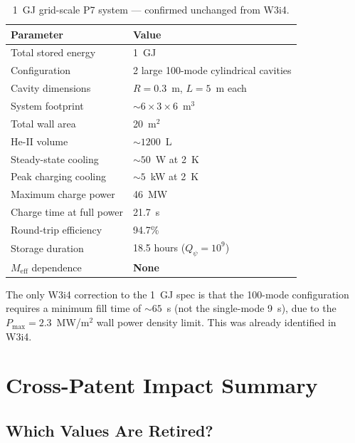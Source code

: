 \documentclass[11pt]{article}
\theoremstyle{definition}
\theoremstyle{remark}
\newcommand{\Meff}{M_{\mathrm{eff}}}
\newcommand{\Qpsi}{Q_\psi}
\newcommand{\Pmax}{P_{\mathrm{max}}}
\begin{document}
\begin{table}[h]
\centering
\caption{1~GJ grid-scale P7 system --- confirmed unchanged from W3i4.}
\label{tab:1GJ}
\begin{tabular}{@{}ll@{}}
\toprule
Parameter & Value \\
\midrule
Total stored energy & 1~GJ \\
Configuration & 2 large 100-mode cylindrical cavities \\
Cavity dimensions & $R = 0.3$~m, $L = 5$~m each \\
System footprint & $\sim 6\times3\times6$~m$^3$ \\
Total wall area & 20~m$^2$ \\
He-II volume & $\sim 1200$~L \\
Steady-state cooling & $\sim 50$~W at 2~K \\
Peak charging cooling & $\sim 5$~kW at 2~K \\
Maximum charge power & 46~MW \\
Charge time at full power & 21.7~s \\
Round-trip efficiency & 94.7\% \\
Storage duration & 18.5 hours ($\Qpsi = 10^9$) \\
\midrule
$\Meff$ dependence & \textbf{None} \\
\bottomrule
\end{tabular}
\end{table}

The only W3i4 correction to the 1~GJ spec is that the 100-mode
configuration requires a minimum fill time of $\sim 65$~s (not the
single-mode 9~s), due to the $\Pmax = 2.3$~MW/m$^2$ wall power density
limit. This was already identified in W3i4.

\section{Cross-Patent Impact Summary}
\label{sec:cross}

\subsection{Which Values Are Retired?}
\end{document}
